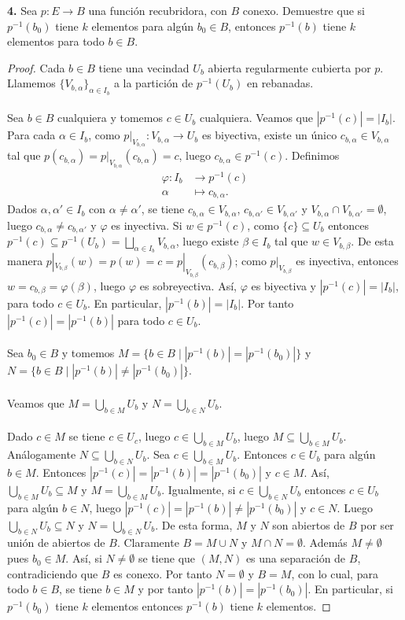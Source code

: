 \textbf{4.} Sea $p:E\to B$ una función recubridora, con $B$ conexo. Demuestre que si $p^{-1}(b_0)$ tiene $k$ elementos para algún $b_0\in B$, entonces $p^{-1}(b)$ tiene $k$ elementos para todo $b\in B$.
\begin{proof}
Cada $b\in B$ tiene una vecindad $U_b$ abierta regularmente cubierta por $p$. Llamemos $\{V_{b,\alpha}\}_{\alpha\in I_b}$ a la partición de $p^{-1}(U_b)$ en rebanadas.\\\\
Sea $b\in B$ cualquiera y tomemos $c\in U_b$ cualquiera. Veamos que $|p^{-1}(c)|=|I_b|$. Para cada $\alpha\in I_b$, como $p|_{V_{b,\alpha}}:V_{b,\alpha}\to U_b$ es biyectiva, existe un único $c_{b,\alpha}\in V_{b,\alpha}$ tal que $p(c_{b,\alpha})=p|_{V_{b,\alpha}}(c_{b,\alpha})=c$, luego $c_{b,\alpha}\in p^{-1}(c)$. Definimos
\begin{align*}
\varphi:I_b&\longrightarrow p^{-1}(c)\\
\alpha&\longmapsto c_{b,\alpha}.
\end{align*}
Dados $\alpha,\alpha'\in I_b$ con $\alpha\neq\alpha'$, se tiene $c_{b,\alpha}\in V_{b,\alpha}$, $c_{b,\alpha'}\in V_{b,\alpha'}$ y $V_{b,\alpha}\cap V_{b,\alpha'}=\emptyset$, luego $c_{b,\alpha}\neq c_{b,\alpha'}$ y $\varphi$ es inyectiva. Si $w\in p^{-1}(c)$, como $\{c\}\subseteq U_b$ entonces $p^{-1}(c)\subseteq p^{-1}(U_b)=\bigsqcup_{\alpha\in I_b}V_{b,\alpha}$, luego existe $\beta\in I_b$ tal que $w\in V_{b,\beta}$. De esta manera $p|_{V_{b,\beta}}(w)=p(w)=c=p|_{V_{b,\beta}}(c_{b,\beta})$; como $p|_{V_{b,\beta}}$ es inyectiva, entonces $w=c_{b,\beta}=\varphi(\beta)$, luego $\varphi$ es sobreyectiva. Así, $\varphi$ es biyectiva y $|p^{-1}(c)|=|I_b|$, para todo $c\in U_b$. En particular, $|p^{-1}(b)|=|I_b|$. Por tanto $|p^{-1}(c)|=|p^{-1}(b)|$ para todo $c\in U_b$.\\\\
Sea $b_0\in B$ y tomemos $M=\{b\in B\mid|p^{-1}(b)|=|p^{-1}(b_0)|\}$ y $N=\{b\in B\mid|p^{-1}(b)|\neq|p^{-1}(b_0)|\}$.\\\\
Veamos que $M=\bigcup_{b\in M}U_b$ y $N=\bigcup_{b\in N}U_b$.\\\\
Dado $c\in M$ se tiene $c\in U_c$, luego $c\in\bigcup_{b\in M}U_b$, luego $M\subseteq\bigcup_{b\in M}U_b$. Análogamente $N\subseteq\bigcup_{b\in N}U_b$. Sea $c\in\bigcup_{b\in M}U_b$. Entonces $c\in U_b$ para algún $b\in M$. Entonces $|p^{-1}(c)|=|p^{-1}(b)|=|p^{-1}(b_0)|$ y $c\in M$. Así, $\bigcup_{b\in M}U_b\subseteq M$ y $M=\bigcup_{b\in M}U_b$. Igualmente, si $c\in\bigcup_{b\in N}U_b$ entonces $c\in U_b$ para algún $b\in N$, luego $|p^{-1}(c)|=|p^{-1}(b)|\neq|p^{-1}(b_0)|$ y $c\in N$. Luego $\bigcup_{b\in N}U_b\subseteq N$ y $N=\bigcup_{b\in N}U_b$. De esta forma, $M$ y $N$ son abiertos de $B$ por ser unión de abiertos de $B$. Claramente $B=M\cup N$ y $M\cap N=\emptyset$. Además $M\neq\emptyset$ pues $b_0\in M$. Así, si $N\neq\emptyset$ se tiene que $(M,N)$ es una separación de $B$, contradiciendo que $B$ es conexo. Por tanto $N=\emptyset$ y $B=M$, con lo cual, para todo $b\in B$, se tiene $b\in M$ y por tanto $|p^{-1}(b)|=|p^{-1}(b_0)|$. En particular, si $p^{-1}(b_0)$ tiene $k$ elementos entonces $p^{-1}(b)$ tiene $k$ elementos.
\end{proof}\clearpage
